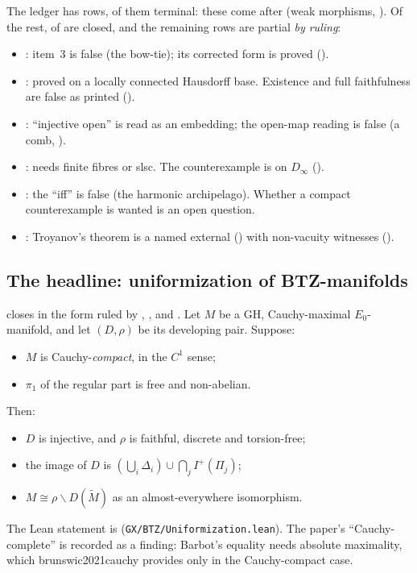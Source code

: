 The ledger has \numGxStatements{} rows, \numGxTerminal{} of them terminal: these come after
\verb|| (weak morphisms, ). Of the rest, \numGxClosed{} of
\numGxTarget{} are closed, and the \numGxPartial{} remaining rows are partial \emph{by ruling}:
\begin{itemize}
\item {}: item~3 is false (the bow-tie); its corrected
  form is proved ().
\item {}: proved on a locally connected Hausdorff base. Existence
  and full faithfulness are false as printed ().
\item {}: ``injective open'' is read as an embedding; the open-map reading
  is false (a comb, ).
\item {}: needs finite fibres or slsc. The counterexample
  is on $D_\infty$ ().
\item {}: the ``iff'' is false (the harmonic
  archipelago). Whether a compact counterexample is wanted is an open question.
\item {}: Troyanov's theorem is a named external
  () with non-vacuity witnesses ().
\end{itemize}

\subsection{The headline: uniformization of BTZ-manifolds}

 closes in the form ruled by
, ,  and . Let $M$ be a GH, Cauchy-maximal $E_0$-manifold,
and let $(D,\rho)$ be its developing pair. Suppose:
\begin{itemize}
\item $M$ is Cauchy-\emph{compact}, in the $C^1$ sense;
\item $\pi_1$ of the regular part is free and non-abelian.
\end{itemize}
Then:
\begin{itemize}
\item $D$ is injective, and $\rho$ is faithful, discrete and torsion-free;
\item the image of $D$ is $(\bigcup_i\Delta_i)\cup\bigcap_jI^+(\Pi_j)$;
\item $M\cong\rho\backslash D(\widetilde M)$ as an almost-everywhere isomorphism.
\end{itemize}
The Lean statement is  (\texttt{GX/BTZ/Uniformization.lean}). The
paper's ``Cauchy-complete'' is recorded as a finding: Barbot's equality needs absolute
maximality, which brunswic2021cauchy provides only in the Cauchy-compact case.

